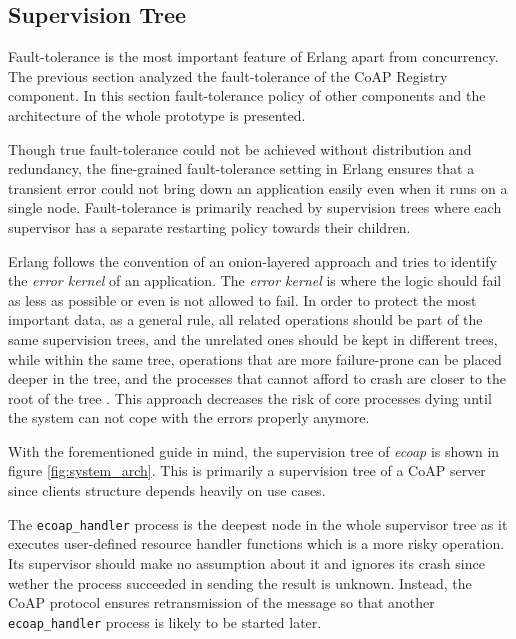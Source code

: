 \begin{figure}
\label{fig:coap_registry}
\end{figure}

\subsection{Supervision Tree}

Fault-tolerance is the most important feature of Erlang apart from concurrency. The previous section analyzed the fault-tolerance of the CoAP Registry component. In this section fault-tolerance policy of other components and the architecture of the whole prototype is presented.

Though true fault-tolerance could not be achieved without distribution and redundancy, the fine-grained fault-tolerance setting in Erlang ensures that a transient error could not bring down an application easily even when it runs on a single node. Fault-tolerance is primarily reached by supervision trees where each supervisor has a separate restarting policy towards their children. 

Erlang follows the convention of an onion-layered approach and tries to identify the \textit{error kernel} of an application. The \textit{error kernel} is where the logic should fail as less as possible or even is not allowed to fail. In order to protect the most important data, as a general rule, all related operations should be part of the same supervision trees, and the unrelated ones should be kept in different trees, while within the same tree, operations that are more failure-prone can be placed deeper in the tree, and the processes that cannot afford to crash are closer to the root of the tree \cite{learn_you_some_erlang}. This approach decreases the risk of core processes dying until the system can not cope with the errors properly anymore.

With the forementioned guide in mind, the supervision tree of \textit{ecoap} is shown in figure \ref{fig:system_arch}. This is primarily a supervision tree of a CoAP server since clients structure depends heavily on use cases. 

The \verb|ecoap_handler| process is the deepest node in the whole supervisor tree as it executes user-defined resource handler functions which is a more risky operation. Its supervisor should make no assumption about it and ignores its crash since wether the process succeeded in sending the result is unknown. Instead, the CoAP protocol ensures retransmission of the message so that another \verb|ecoap_handler| process is likely to be started later. 

